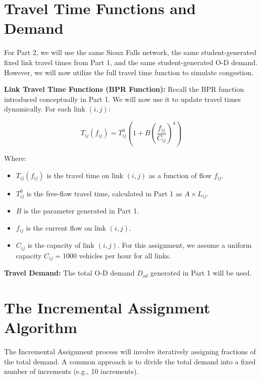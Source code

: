 \documentclass{rapportCS} %
\begin{document}
\newpage
\section{Travel Time Functions and Demand}

For Part 2, we will use the same Sioux Falls network, the same student-generated fixed link travel times from Part 1, and the same student-generated O-D demand. However, we will now utilize the full travel time function to simulate congestion.

\textbf{Link Travel Time Functions (BPR Function):}
Recall the BPR function introduced conceptually in Part 1. We will now use it to update travel times dynamically. For each link \( (i, j) \):

$$ T_{ij}(f_{ij}) = T_{ij}^0 \left( 1 + B \left( \frac{f_{ij}}{C_{ij}} \right)^4 \right) $$

Where:
\begin{itemize}
    \item \( T_{ij}(f_{ij}) \) is the travel time on link \( (i, j) \) as a function of flow \( f_{ij} \).
    \item \( T_{ij}^0 \) is the free-flow travel time, calculated in Part 1 as \( A \times L_{ij} \).
    \item \( B \) is the parameter generated in Part 1.
    \item \( f_{ij} \) is the current flow on link \( (i, j) \).
    \item \( C_{ij} \) is the capacity of link \( (i, j) \). For this assignment, we assume a uniform capacity \( C_{ij} = 1000 \) vehicles per hour for all links.
\end{itemize}

\textbf{Travel Demand:}
The total O-D demand \( D_{od} \) generated in Part 1 will be used.

\newpage
\section{The Incremental Assignment Algorithm}

The Incremental Assignment process will involve iteratively assigning fractions of the total demand. A common approach is to divide the total demand into a fixed number of increments (e.g., 10 increments).
\end{document}
